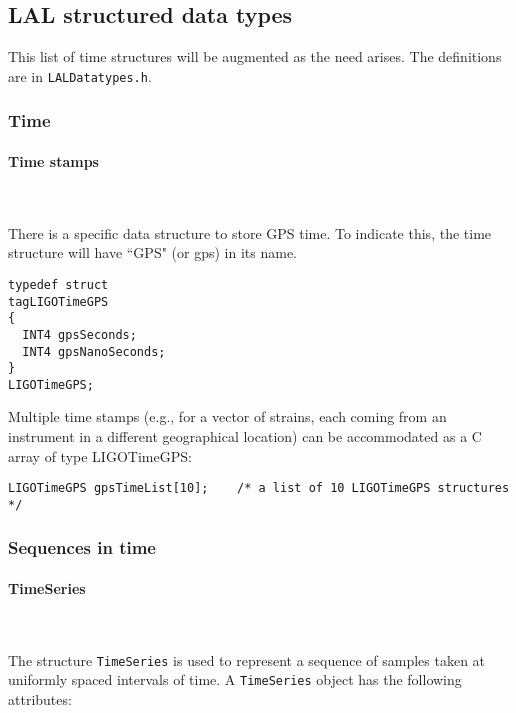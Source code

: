 \documentclass[]{ligodcc}
\renewcommand{\texttt}[1]{{\ttfamily\color{blue}#1}}
\begin{document}
\subsection{LAL structured data types}
\label{structured}

This list of time structures will be augmented as the need arises. The
definitions are in {\tt LALDatatypes.h}.


\subsubsection{Time}

\paragraph{Time stamps }~

There is a specific data structure to store GPS time. To indicate
this, the time structure will have ``GPS" (or gps) in its name.

{\footnotesize
\begin{verbatim}
typedef struct
tagLIGOTimeGPS
{
  INT4 gpsSeconds;
  INT4 gpsNanoSeconds;
}
LIGOTimeGPS;
\end{verbatim}}

Multiple time stamps (e.g., for a vector of strains, each coming from
an instrument in a different geographical location) can be
accommodated as a C array of type LIGOTimeGPS:
{\footnotesize
\begin{verbatim}
LIGOTimeGPS gpsTimeList[10];	/* a list of 10 LIGOTimeGPS structures */
\end{verbatim}}

\subsubsection{Sequences in time}


\paragraph{{\texttt {TimeSeries}} }~

The structure {\tt TimeSeries} is used to represent a sequence of samples
taken at uniformly spaced intervals of time. A {\tt TimeSeries} object has
the following attributes:
\end{document}
